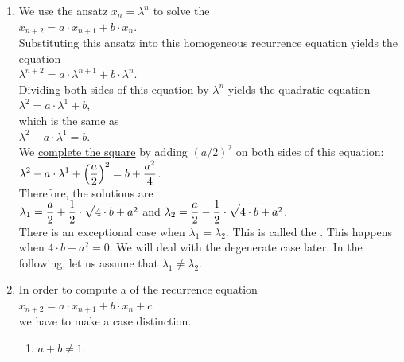 \begin{enumerate}
\item We use the ansatz $x_n = \lambda^n$ to solve the 
      \\[0.2cm]
      \hspace*{1.3cm}
      $x_{n+2} = a \cdot x_{n+1} + b \cdot x_n$.
      \\[0.2cm]
      Substituting this ansatz into this homogeneous recurrence equation yields the equation
      \\[0.2cm]
      \hspace*{1.3cm}
      $\lambda^{n+2} = a \cdot \lambda^{n+1} + b \cdot \lambda^n$.
      \\[0.2cm]
      Dividing both sides of this equation by $\lambda^n$ yields the quadratic equation
      \\[0.2cm]
      \hspace*{1.3cm}
      $\lambda^{2} = a \cdot \lambda^{1} + b$,
      \\[0.2cm]
      which is the same as
      \\[0.2cm]
      \hspace*{1.3cm}
      $\lambda^{2} - a \cdot \lambda^{1} = b$.
      \\[0.2cm]
      We \href{https://en.wikipedia.org/wiki/Completing_the_square}{complete the square} by adding $(a/2)^2$ on
      both sides of this equation: 
      \\[0.2cm]
      \hspace*{1.3cm}
      $\displaystyle \lambda^{2} - a \cdot \lambda^{1} + \Bigl(\frac{a}{2}\Bigr)^2 = b + \frac{a^2}{4}$.
      \\[0.2cm]
      Therefore, the solutions are
      \\[0.2cm]
      \hspace*{1.3cm}
      $\displaystyle\lambda_1 = \frac{a}{2} + \frac{1}{2} \cdot \sqrt{4 \cdot b + a^2}$ \quad and \quad
      $\displaystyle\lambda_2 = \frac{a}{2} - \frac{1}{2} \cdot \sqrt{4 \cdot b + a^2}$.
      \\[0.2cm]
      There is an exceptional case when $\lambda_1 = \lambda_2$.  This is called the 
      .
      This happens when $4 \cdot b + a^2 = 0$.  We will deal with the degenerate case later.  In the
      following, let us assume that $\lambda_1 \not= \lambda_2$.
\item In order to compute a   of the  recurrence equation
      \\[0.2cm]
      \hspace*{1.3cm}
      $x_{n+2} = a \cdot x_{n+1} + b \cdot x_n + c$
      \\[0.2cm]
      we have to make a case distinction.
      \begin{enumerate}
      \item $a + b \not= 1$.


\end{enumerate}
\end{enumerate}
